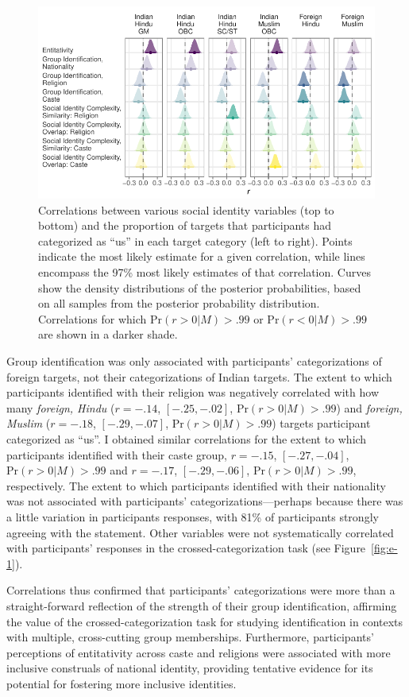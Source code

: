\documentclass[12pt, a4paper]{article}
\begin{document}
\begin{figure}
\centering
\includegraphics{../figures/appendices/appendices-e-1}
\caption[Correlations between social identity variables and target categorizations]{Correlations between various social identity variables (top to bottom) and the proportion of targets that participants had categorized as ``us'' in each target category (left to right). Points indicate the most likely estimate for a given correlation, while lines encompass the 97\% most likely estimates of that correlation. Curves show the density distributions of the posterior probabilities, based on all samples from the posterior probability distribution. Correlations for which $\text{Pr} (r > 0| M) > .99$ or $\text{Pr} (r < 0| M) > .99$ are shown in a darker shade.}
\label{fig:f-1}
\end{figure}

Group identification was only associated with participants' categorizations of foreign targets, not their categorizations of Indian targets. The extent to which participants identified with their religion was negatively correlated with how many \emph{foreign, Hindu} ($r = -.14$, $[-.25, -.02]$, $\text{Pr} (r > 0| M) > .99$) and \emph{foreign, Muslim} ($r = -.18$, $[-.29, -.07]$, $\text{Pr} (r > 0| M) > .99$) targets participant categorized as ``us''. I obtained similar correlations for the extent to which participants identified with their caste group, $r = -.15$, $[-.27, -.04]$, $\text{Pr} (r > 0| M) > .99$ and $r = -.17$, $[-.29, -.06]$, $\text{Pr} (r > 0| M) > .99$, respectively. The extent to which participants identified with their nationality was not associated with participants' categorizations---perhaps because there was a little variation in participants responses, with 81\% of participants strongly agreeing with the statement. Other variables were not systematically correlated with participants' responses in the crossed-categorization task (see Figure~\ref{fig:e-1}).

Correlations thus confirmed that participants' categorizations were more than a straight-forward reflection of the strength of their group identification, affirming the value of the crossed-categorization task for studying identification in contexts with multiple, cross-cutting group memberships. Furthermore, participants' perceptions of entitativity across caste and religions were associated with more inclusive construals of national identity, providing tentative evidence for its potential for fostering more inclusive identities.



\end{document}

